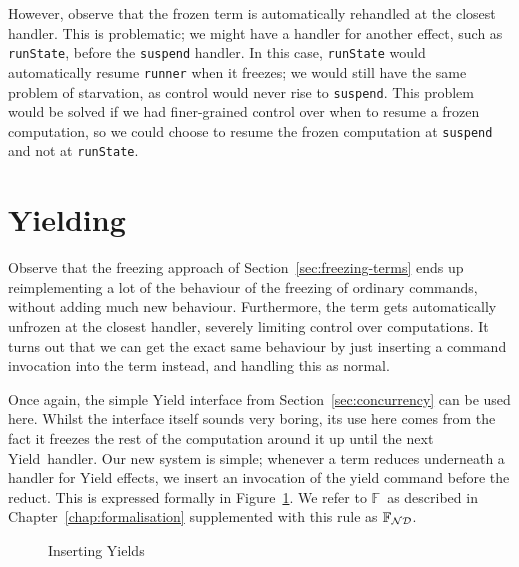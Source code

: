 \documentclass[msc,deptreport,cs]{infthesis} %
\newcommand{\code}[1]{\lstinline{#1}}
\newcommand\figscale{0.9}
\newcommand\nondetfrank{$\mathbb{F}_{\cal{ND}}$}
\newcommand\purefrank{$\mathbb{F}$}
\newcommand\yield{\textsf{yield}\xspace}
\newcommand\Yield{\textsf{Yield}\xspace}
\newcommand{\todo}[1]
           {{\par\noindent\small\color{RoyalPurple}
  \framebox{\parbox{\dimexpr\linewidth-2\fboxsep-2\fboxrule}
    {\textbf{TODO:} #1}}}}
\newcommand{\EF}{\mathcal{F}}
\newcommand{\redtou}{\leadsto_{\mathrm{u}}}
\newcommand{\redtoc}{\leadsto_{\mathrm{c}}}
\begin{document}
However, observe that the frozen term is automatically rehandled at the closest
handler. This is problematic; we might have a handler for another effect, such
as \code{runState}, before the \code{suspend} handler. In this case,
\code{runState} would automatically resume \code{runner} when it freezes; we
would still have the same problem of starvation, as control would never rise to
\code{suspend}. This problem would be solved if we had finer-grained control
over when to resume a frozen computation, so we could choose to resume the
frozen computation at \code{suspend} and not at \code{runState}.


\section{Yielding}
\label{sec:inserting-yields}

Observe that the freezing approach of Section~\ref{sec:freezing-terms} ends up
reimplementing a lot of the behaviour of the freezing of ordinary commands,
without adding much new behaviour. Furthermore, the term gets automatically
unfrozen at the closest handler, severely limiting control over computations. It
turns out that we can get the exact same behaviour by just inserting a command
invocation into the term instead, and handling this as normal.
%

Once again, the simple \Yield interface from Section~\ref{sec:concurrency} can
be used here. Whilst the interface itself sounds very boring, its use here comes
from the fact it freezes the rest of the computation around it up until the next
\Yield~handler. Our new system is simple; whenever a term reduces underneath a
handler for \Yield effects, we insert an invocation of the \yield command before
the reduct. This is expressed formally in Figure~\ref{fig:insert-yield}. We
refer to \purefrank~as described in Chapter~\ref{chap:formalisation}
supplemented with this rule as \nondetfrank.


\begin{figure}[h]

\scalebox{\figscale}{%
\begin{mathpar}
%

\inferrule[R-Yield]
{ n \redtoc n' \\
  \EF~\textsf{allows}~\yield }
          { \EF[n] \redtou \EF[\textsf{yield}!; n] }
\end{mathpar}
}
%
%
\caption{Inserting Yields}
\label{fig:insert-yield}
\end{figure}
\end{document}
